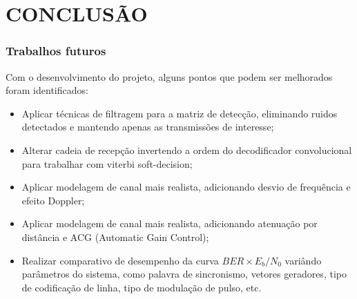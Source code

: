 \chapter{CONCLUSÃO}\label{cap:conclusao}

\subsection{Trabalhos futuros}

Com o desenvolvimento do projeto, alguns pontos que podem ser melhorados foram identificados: 
\begin{itemize}
    \item Aplicar técnicas de filtragem para a matriz de detecção, eliminando ruidos detectados e mantendo apenas as transmissões de interesse; 
    \item Alterar cadeia de recepção invertendo a ordem do decodificador convolucional para trabalhar com viterbi soft-decision;
    \item Aplicar modelagem de canal mais realista, adicionando desvio de frequência e efeito Doppler;
    \item Aplicar modelagem de canal mais realista, adicionando atenuação por distância e ACG (Automatic Gain Control);
    \item Realizar comparativo de desempenho da curva $BER \times E_b/N_0$ variândo parâmetros do sistema, como palavra de sincronismo, vetores geradores, tipo de codificação de linha, tipo de modulação de pulso, etc.
\end{itemize}